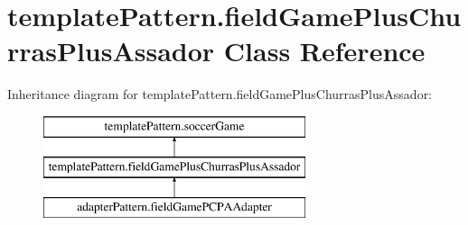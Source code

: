 \hypertarget{classtemplate_pattern_1_1field_game_plus_churras_plus_assador}{}\section{template\+Pattern.\+field\+Game\+Plus\+Churras\+Plus\+Assador Class Reference}
\label{classtemplate_pattern_1_1field_game_plus_churras_plus_assador}
Inheritance diagram for template\+Pattern.\+field\+Game\+Plus\+Churras\+Plus\+Assador\+:\begin{figure}[H]
\begin{center}
\leavevmode
\includegraphics[height=3.000000cm]{classtemplate_pattern_1_1field_game_plus_churras_plus_assador}
\end{center}
\end{figure}
